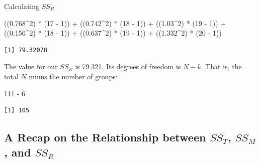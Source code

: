 \documentclass[
  11pt,
]{book}
\newenvironment{Shaded}{\begin{snugshade}}{\end{snugshade}}
\newcommand{\DecValTok}[1]{\textcolor[rgb]{0.00,0.00,0.81}{#1}}
\newcommand{\FloatTok}[1]{\textcolor[rgb]{0.00,0.00,0.81}{#1}}
\newcommand{\NormalTok}[1]{#1}
\newcommand{\SpecialCharTok}[1]{\textcolor[rgb]{0.00,0.00,0.00}{#1}}
\begin{document}
Calculating \(SS_R\)

\begin{Shaded}
\begin{Highlighting}[]
\NormalTok{((}\FloatTok{0.768}\SpecialCharTok{\^{}}\DecValTok{2}\NormalTok{) }\SpecialCharTok{*}\NormalTok{ (}\DecValTok{17} \SpecialCharTok{{-}} \DecValTok{1}\NormalTok{)) }\SpecialCharTok{+}\NormalTok{ ((}\FloatTok{0.742}\SpecialCharTok{\^{}}\DecValTok{2}\NormalTok{) }\SpecialCharTok{*}\NormalTok{ (}\DecValTok{18} \SpecialCharTok{{-}} \DecValTok{1}\NormalTok{)) }\SpecialCharTok{+}\NormalTok{ ((}\FloatTok{1.03}\SpecialCharTok{\^{}}\DecValTok{2}\NormalTok{) }\SpecialCharTok{*}\NormalTok{ (}\DecValTok{19} \SpecialCharTok{{-}} \DecValTok{1}\NormalTok{)) }\SpecialCharTok{+}
\NormalTok{    ((}\FloatTok{0.156}\SpecialCharTok{\^{}}\DecValTok{2}\NormalTok{) }\SpecialCharTok{*}\NormalTok{ (}\DecValTok{18} \SpecialCharTok{{-}} \DecValTok{1}\NormalTok{)) }\SpecialCharTok{+}\NormalTok{ ((}\FloatTok{0.637}\SpecialCharTok{\^{}}\DecValTok{2}\NormalTok{) }\SpecialCharTok{*}\NormalTok{ (}\DecValTok{19} \SpecialCharTok{{-}} \DecValTok{1}\NormalTok{)) }\SpecialCharTok{+}\NormalTok{ ((}\FloatTok{1.332}\SpecialCharTok{\^{}}\DecValTok{2}\NormalTok{) }\SpecialCharTok{*}\NormalTok{ (}\DecValTok{20} \SpecialCharTok{{-}}
    \DecValTok{1}\NormalTok{))}
\end{Highlighting}
\end{Shaded}

\begin{verbatim}
[1] 79.32078
\end{verbatim}

The value for our \(SS_R\) is 79.321. Its degrees of freedom is \(N - k\). That is, the total \(N\) minus the number of groups:

\begin{Shaded}
\begin{Highlighting}[]
\DecValTok{111} \SpecialCharTok{{-}} \DecValTok{6}
\end{Highlighting}
\end{Shaded}

\begin{verbatim}
[1] 105
\end{verbatim}

\hypertarget{a-recap-on-the-relationship-between-ss_t-ss_m-and-ss_r}{%
\subsection{\texorpdfstring{A Recap on the Relationship between \(SS_T\), \(SS_M\), and \(SS_R\)}{A Recap on the Relationship between SS\_T, SS\_M, and SS\_R}}\label{a-recap-on-the-relationship-between-ss_t-ss_m-and-ss_r}}
\end{document}
